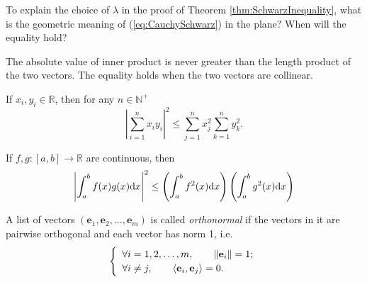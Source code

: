 \begin{exc}
  To explain the choice of $\lambda$ in the proof
  of Theorem \ref{thm:SchwarzInequality}, 
  what is the geometric meaning of (\ref{eq:CauchySchwarz})
  in the plane? When will the equality hold?
\end{exc}
\begin{solution}
  The absolute value of inner product
  is never greater than the length product of the two vectors.
  The equality holds when the two vectors are collinear.
\end{solution}

\begin{exm}
  \label{exm:CS1}
  If $x_i,y_i\in \mathbb{R}$, then for any $n\in \mathbb{N}^+$
  \begin{equation*}
    \left|\sum_{i=1}^n x_iy_i\right|^2
    \le \sum_{j=1}^nx_j^2 \sum_{k=1}^ny_k^2.
  \end{equation*}
\end{exm}

\begin{exm}
  \label{exm:CS2}
  If $f,g: [a,b]\rightarrow \mathbb{R}$ are continuous, then
  \begin{equation*}
    \left|\int_{a}^{b} f(x) g(x) \mathrm{d} x\right|^2
    \le      
    \left(\int_{a}^{b} f^2(x) \mathrm{d} x\right)
    \left(\int_{a}^{b} g^2(x) \mathrm{d} x\right)
  \end{equation*}
\end{exm}




\begin{defn}
  \label{def:orthonormalList}
  A list of vectors
  $(\mathbf{e}_1, \mathbf{e}_2, \ldots, \mathbf{e}_m)$
  is called \emph{orthonormal}
  if the vectors in it are pairwise orthogonal
  and each vector has norm 1, i.e.
  \begin{equation}
    \label{eq:orthonormalList}
    \renewcommand{\arraystretch}{1.2}
    \left\{
      \begin{array}{l}
        \forall i=1,2,\ldots,m, \qquad
        \|\mathbf{e}_i\| = 1;
        \\
        \forall i\ne j, \qquad \innerProd{\mathbf{e}_i, \mathbf{e}_j}=0.
      \end{array}
    \right.
  \end{equation}
\end{defn}


